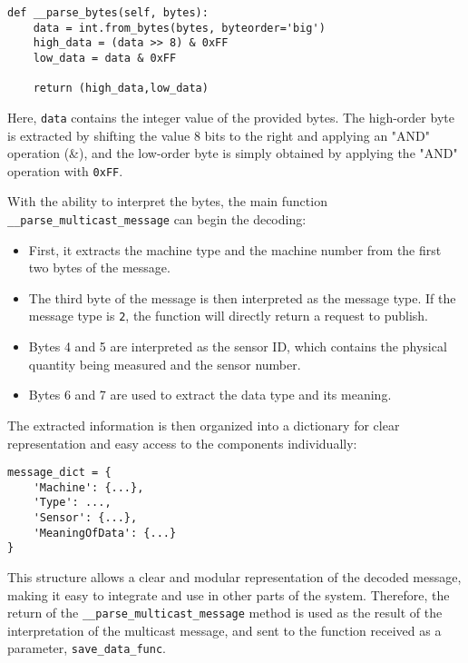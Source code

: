 \begin{Verbatim}[fontsize=\small, baselinestretch=0.8]
def __parse_bytes(self, bytes):
    data = int.from_bytes(bytes, byteorder='big')
    high_data = (data >> 8) & 0xFF
    low_data = data & 0xFF

    return (high_data,low_data)
\end{Verbatim}

Here, \texttt{data} contains the integer value of the provided bytes. The high-order byte is extracted by shifting the value 8 bits to the right and applying an "AND" operation (\&), and the low-order byte is simply obtained by applying the "AND" operation with \texttt{0xFF}.

With the ability to interpret the bytes, the main function \texttt{\_\_parse\_multicast\_message} can begin the decoding:

\begin{itemize}
    \item First, it extracts the machine type and the machine number from the first two bytes of the message.
    
    \item The third byte of the message is then interpreted as the message type. If the message type is \texttt{2}, the function will directly return a request to publish.
    
    \item Bytes 4 and 5 are interpreted as the sensor ID, which contains the physical quantity being measured and the sensor number.
    
    \item Bytes 6 and 7 are used to extract the data type and its meaning.
\end{itemize}

The extracted information is then organized into a dictionary for clear representation and easy access to the components individually:

\begin{Verbatim}[fontsize=\small, baselinestretch=0.8]
message_dict = {
    'Machine': {...},
    'Type': ...,
    'Sensor': {...},
    'MeaningOfData': {...}
}
\end{Verbatim}

This structure allows a clear and modular representation of the decoded message, making it easy to integrate and use in other parts of the system. Therefore, the return of the \texttt{\_\_parse\_multicast\_message} method is used as the result of the interpretation of the multicast message, and sent to the function received as a parameter, \texttt{save\_data\_func}.

